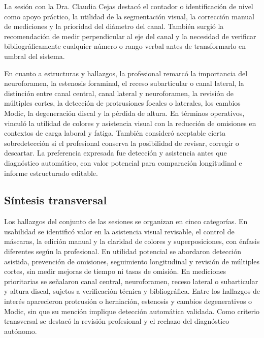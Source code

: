 La sesión con la Dra. Claudia Cejas destacó el contador o identificación de nivel como apoyo práctico, la utilidad de la segmentación visual, la corrección manual de mediciones y la prioridad del diámetro del canal. También surgió la recomendación de medir perpendicular al eje del canal y la necesidad de verificar bibliográficamente cualquier número o rango verbal antes de transformarlo en umbral del sistema.

En cuanto a estructuras y hallazgos, la profesional remarcó la importancia del neuroforamen, la estenosis foraminal, el receso subarticular o canal lateral, la distinción entre canal central, canal lateral y neuroforamen, la revisión de múltiples cortes, la detección de protrusiones focales o laterales, los cambios Modic, la degeneración discal y la pérdida de altura. En términos operativos, vinculó la utilidad de colores y asistencia visual con la reducción de omisiones en contextos de carga laboral y fatiga. También consideró aceptable cierta sobredetección si el profesional conserva la posibilidad de revisar, corregir o descartar. La preferencia expresada fue detección y asistencia antes que diagnóstico automático, con valor potencial para comparación longitudinal e informe estructurado editable.

\subsection{Síntesis transversal}

Los hallazgos del conjunto de las sesiones se organizan en cinco categorías. En usabilidad se identificó valor en la asistencia visual revisable, el control de máscaras, la edición manual y la claridad de colores y superposiciones, con énfasis diferentes según la profesional. En utilidad potencial se abordaron detección asistida, prevención de omisiones, seguimiento longitudinal y revisión de múltiples cortes, sin medir mejoras de tiempo ni tasas de omisión. En mediciones prioritarias se señalaron canal central, neuroforamen, receso lateral o subarticular y altura discal, sujetos a verificación técnica y bibliográfica. Entre los hallazgos de interés aparecieron protrusión o herniación, estenosis y cambios degenerativos o Modic, sin que su mención implique detección automática validada. Como criterio transversal se destacó la revisión profesional y el rechazo del diagnóstico autónomo.

